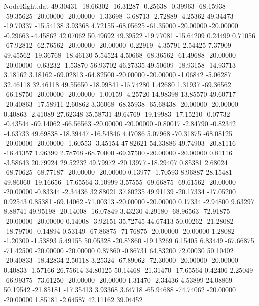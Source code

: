 \begin{filecontents}{NodeRight.dat}
  49.30431  -18.66302  -16.31287    -0.25638   -0.39963  -68.15938  -59.35625  -20.00000  -20.00000   -1.33698   -3.68713   -2.72889   -4.25362
  49.34473  -19.70337  -15.54138     3.93368    4.72155  -68.05625  -61.35000  -20.00000  -20.00000   -0.29663   -4.45862   42.07062   50.49692
  49.39522  -19.77081  -15.64209     0.24499    0.71056  -67.92812  -62.76562  -20.00000  -20.00000   -0.22919   -4.35791    2.54425    7.37909
  49.45562  -19.36768  -18.46130     5.54524    4.50668  -68.36562  -61.49688  -20.00000  -20.00000   -0.63232   -1.53870   56.93702   46.27335
  49.50609  -18.93158  -14.93713     3.18162    3.18162  -69.02813  -64.82500  -20.00000  -20.00000   -1.06842   -5.06287   32.46118   32.46118
  49.55650  -18.99841  -15.74280     1.42680    1.31937  -69.36562  -66.18750  -20.00000  -20.00000   -1.00159   -4.25720   14.98398   13.85570
  49.60717  -20.40863  -17.58911     2.60862    3.36068  -68.35938  -65.68438  -20.00000  -20.00000    0.40863   -2.41089   27.62348   35.58731
  49.64769  -19.19983  -17.15210    -0.07732   -0.43544  -69.14062  -66.56563  -20.00000  -20.00000   -0.80017   -2.84790   -0.82342   -4.63733
  49.69838  -18.39447  -16.54846     4.47086    5.07968  -70.31875  -68.08125  -20.00000  -20.00000   -1.60553   -3.45154   47.82621   54.33886
  49.74903  -20.81116  -16.41357     1.96399    2.78768  -68.70000  -69.37500  -20.00000  -20.00000    0.81116   -3.58643   20.79924   29.52232
  49.79972  -20.13977  -18.29407     0.85381    2.68024  -68.70625  -68.77187  -20.00000  -20.00000    0.13977   -1.70593    8.96887   28.15481
  49.86060  -19.16656  -17.65564     3.10999    3.57555  -69.66875  -69.61562  -20.00000  -20.00000   -0.83344   -2.34436   32.88021   37.80235
  49.91139  -20.17334  -17.05200     0.92543    0.85381  -69.14062  -71.00313  -20.00000  -20.00000    0.17334   -2.94800    9.63297    8.88741
  49.95198  -20.14008  -16.07849     3.43230    4.29180  -68.96563  -72.91875  -20.00000  -20.00000    0.14008   -3.92151   35.72745   44.67413
  50.00262  -21.28082  -18.79700    -0.14894    0.53149  -67.86875  -71.76875  -20.00000  -20.00000    1.28082   -1.20300   -1.53893    5.49155
  50.05328  -20.87860  -19.13269     6.15405    6.83449  -67.66875  -71.42500  -20.00000  -20.00000    0.87860   -0.86731   64.83200   72.00030
  50.10402  -20.40833  -18.42834     2.50118    3.25324  -67.89062  -72.30000  -20.00000  -20.00000    0.40833   -1.57166   26.75614   34.80125
  50.14468  -21.31470  -17.65564     0.42406    2.25049  -66.99375  -73.61250  -20.00000  -20.00000    1.31470   -2.34436    4.53899   24.08869
  50.19542  -21.85181  -17.35413     3.93368    3.64718  -65.94688  -74.74062  -20.00000  -20.00000    1.85181   -2.64587   42.11162   39.04452

\end{filecontents}
